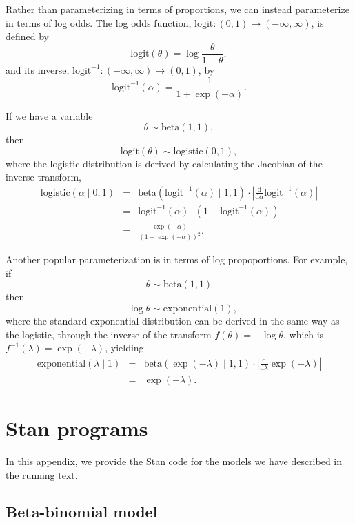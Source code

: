\documentclass[11pt]{report}
\newcommand{\logit}{\textrm{logit}}
\newcommand{\ilogit}{\logit^{-1}}
\begin{document}
Rather than parameterizing in terms of proportions, we can instead
parameterize in terms of log odds.  The log odds function, $\logit:(0,
1) \rightarrow (-\infty, \infty)$, is defined by
%
\[
  \logit(\theta) = \log \frac{\theta}{1 - \theta},
\]
and its inverse, $\ilogit:(-\infty, \infty) \rightarrow (0, 1)$, by
\[
  \ilogit(\alpha) = \frac{1}{1 + \exp(-\alpha)}.
\]

If we have a variable
\[
  \theta \sim \textrm{beta}(1, 1),
\]
then
\[
  \logit(\theta) \sim \textrm{logistic}(0, 1),
\]
%
where the logistic distribution is derived by calculating the Jacobian
of the inverse transform,
%
\begin{eqnarray*}
  \textrm{logistic}(\alpha \mid 0, 1)
  & = & \textrm{beta}(\ilogit(\alpha) \mid 1, 1)
        \cdot
        \left|
        \frac{\textrm{d}}{\textrm{d}\alpha} \ilogit(\alpha)
        \right|
  \\[4pt]
  & = & \ilogit(\alpha) \cdot (1 - \ilogit(\alpha))
  \\[2pt]
  & = & \frac{\exp(-\alpha)}{(1 + \exp(-\alpha))^2}.
\end{eqnarray*}

Another popular parameterization is in terms of log propoportions.
For example, if
\[
  \theta \sim \textrm{beta}(1, 1)
\]
then
\[
  -\log \theta \sim \textrm{exponential}(1),
\]
where the standard exponential distribution can be derived in the same
way as the logistic, through the inverse of the transform $f(\theta) =
-\log \theta$, which is $f^{-1}(\lambda) = \exp(-\lambda)$, yielding
%
\begin{eqnarray*}
  \textrm{exponential}(\lambda \mid 1)
  & = & \textrm{beta}(\exp(-\lambda) \mid 1, 1)
        \cdot
        \left|
        \frac{\textrm{d}}{\textrm{d}\lambda} \exp(-\lambda)
        \right|
  \\[4pt]
  & = &
        \exp(-\lambda).
\end{eqnarray*}


\chapter{Stan programs}

In this appendix, we provide the Stan code for the models we have
described in the running text.

\section{Beta-binomial model}
\end{document}
